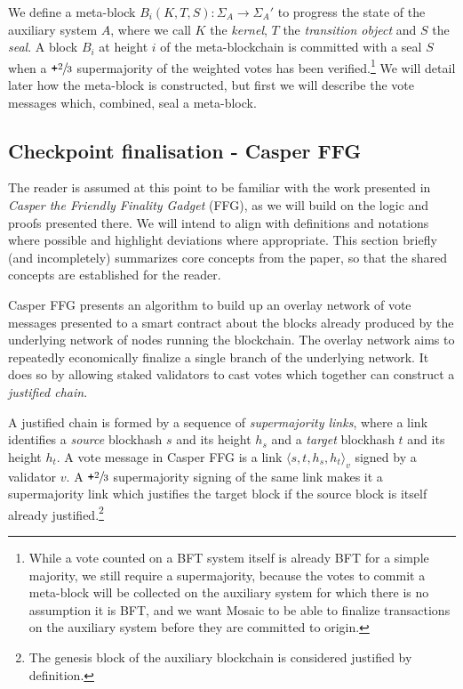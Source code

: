\documentclass[12pt,a4paper]{article}
\begin{document}
We define a meta-block $B_i(K, T, S): \Sigma_A \rightarrow \Sigma_A'$ to progress the state of the auxiliary system $A$, where we call $K$ the \emph{kernel}, $T$ the \emph{transition object} and $S$ the \emph{seal}.
A block $B_i$ at height $i$ of the meta-blockchain is committed with a seal $S$ when a $\texttt{+}\sfrac{2}{3}$ supermajority of the weighted votes has been verified.\footnote{
	While a vote counted on a BFT system itself is already BFT for a simple majority, %
	we still require a supermajority, because the votes to commit a meta-block will be collected on the auxiliary system for which there is no assumption it is BFT, and we want Mosaic to be able to finalize transactions on the auxiliary system before they are committed to origin.
}
We will detail later how the meta-block is constructed, but first we will describe the vote messages which, combined, seal a meta-block.

\subsection{Checkpoint finalisation - Casper FFG}
The reader is assumed at this point to be familiar with the work presented in \textit{Casper the Friendly Finality Gadget}\cite{casperffg} (FFG), as we will build on the logic and proofs presented there.
We will intend to align with definitions and notations where possible and highlight deviations where appropriate.
This section briefly (and incompletely) summarizes core concepts from the paper, so that the shared concepts are established for the reader.

Casper FFG presents an algorithm to build up an overlay network of vote messages presented to a smart contract about the blocks already produced by the underlying network of nodes running the blockchain.
The overlay network aims to repeatedly economically finalize a single branch of the underlying network.
It does so by allowing staked validators to cast votes which together can construct a \emph{justified chain}.

A justified chain is formed by a sequence of \emph{supermajority links}, where a link identifies a \emph{source} blockhash $s$ and its height $h_s$ and a \emph{target} blockhash $t$ and its height $h_t$.
A vote message in Casper FFG is a link $\langle s, t, h_s, h_t\rangle_v$ signed by a validator $v$.
A $\texttt{+}\sfrac{2}{3}$ supermajority signing of the same link makes it a supermajority link which justifies the target block if the source block is itself already justified.\footnote{
	The genesis block of the auxiliary blockchain is considered justified by definition.
}
\end{document}

